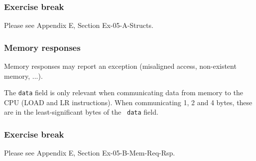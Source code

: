 
\begin{frame}
\frametitle{\EmojiExercise \hmm Exercise break}

Please see Appendix E, Section Ex-05-A-Structs.

\end{frame}


\begin{frame}[fragile]
\frametitle{Memory responses}

\footnotesize

Memory responses may report an exception (misaligned access,
non-existent memory, ...).

\vspace{2ex}


\vspace{4ex}


\vspace{1ex}

The {\tt data} field is only relevant when communicating data from
memory to the CPU (LOAD and LR instructions).  When communicating 1, 2
and 4 bytes, these are in the least-significant bytes of the {\tt
data} field.

\end{frame}


\begin{frame}
\frametitle{\EmojiExercise \hmm Exercise break}

Please see Appendix E, Section Ex-05-B-Mem-Req-Rsp.

\end{frame}


